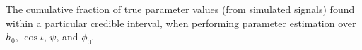 \label{fig:pp_standard}
The cumulative fraction of true parameter values (from simulated signals) found within
a particular credible interval, when performing parameter estimation over $h_0$, $\cos{\iota}$,
$\psi$, and $\phi_0$.
